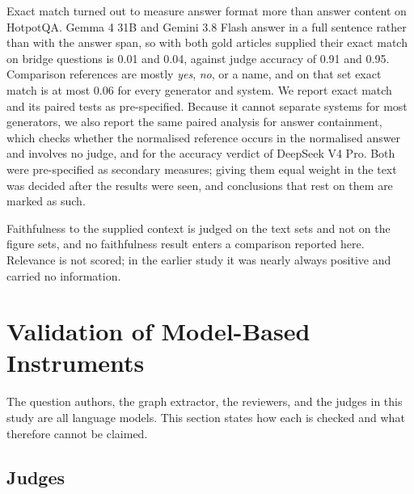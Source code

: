 \documentclass[preprint,12pt]{elsarticle}
\begin{document}
Exact match turned out to measure answer format more than answer content on
HotpotQA. Gemma 4 31B and Gemini 3.8 Flash answer in a full sentence rather
than with the answer span, so with both gold articles supplied their exact
match on bridge questions is 0.01 and 0.04, against judge accuracy of 0.91
and 0.95. Comparison references are mostly \emph{yes}, \emph{no}, or a name,
and on that set exact match is at most 0.06 for every generator and system. We
report exact match and its paired tests as pre-specified. Because it cannot
separate systems for most generators, we also report the same paired analysis
for answer containment, which checks whether the normalised reference occurs in
the normalised answer and involves no judge, and for the accuracy verdict of
DeepSeek V4 Pro. Both were pre-specified as secondary measures; giving them
equal weight in the text was decided after the results were seen, and
conclusions that rest on them are marked as such.

Faithfulness to the supplied context is judged on the text sets and not on
the figure sets, and no faithfulness result enters a comparison reported here.
Relevance is not scored; in the earlier study it was nearly always positive and
carried no information.

\section{Validation of Model-Based Instruments}
\label{sec:validation}

The question authors, the graph extractor, the reviewers, and the judges in
this study are all language models. This section states how each
is checked and what therefore cannot be claimed.

\subsection{Judges}
\label{sec:judges}
\end{document}
